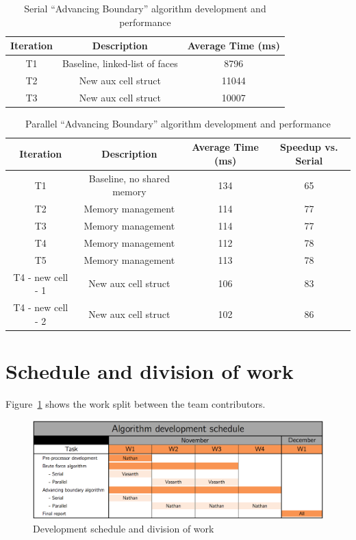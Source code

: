 \documentclass[]{aiaa-tc}%
\begin{document}
\begin{table}[h]
  \centering
  \begin{tabular}{ccc}
    Iteration & Description & Average Time (ms) \\
    \hline\hline
    T1 & Baseline, linked-list of faces & 8796 \\
    T2 & New aux cell struct & 11044 \\
    T3 & New aux cell struct & 10007 \\
    \hline
  \end{tabular}
  \caption{Serial ``Advancing Boundary'' algorithm development and performance}
  \label{t:serial}
\end{table}



\begin{table}[h]
  \centering
  \begin{tabular}{cccc}
    Iteration & Description & Average Time (ms) & Speedup vs. Serial\\
    \hline\hline
    T1 & Baseline, no shared memory & 134 & 65\\
    T2 & Memory management & 114 & 77\\
    T3 & Memory management & 114 & 77\\
    T4 & Memory management & 112 & 78\\
    T5 & Memory management & 113 & 78\\
    T4 - new cell - 1 & New aux cell struct & 106 & 83\\
    T4 - new cell - 2& New aux cell struct & 102 & 86\\
    \hline
  \end{tabular}
  \caption{Parallel ``Advancing Boundary'' algorithm development and performance}
  \label{t:parallel}
\end{table}



\section{Schedule and division of work}
Figure~\ref{f:schedule} shows the work split between the team contributors.

\begin{figure}
  \centering
  \includegraphics[width=0.9\linewidth]{figures/schedule_update}
  \caption{Development schedule and division of work}
  \label{f:schedule}
\end{figure}
\end{document}

